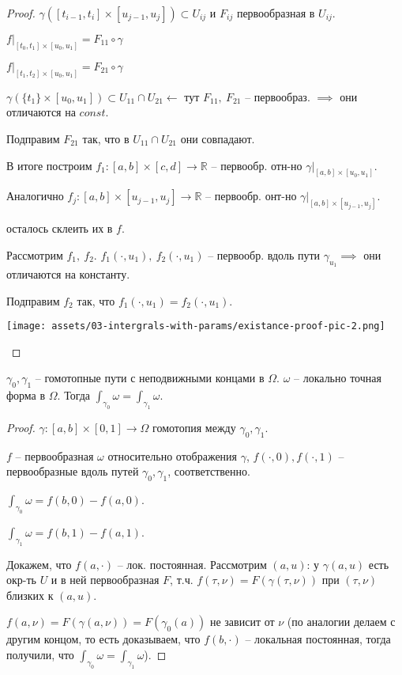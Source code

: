 \begin{proof}
    $\gamma([t_{i - 1}, t_i] \times [u_{j - 1}, u_j]) \subset U_{ij}$ и $F_{ij}$ первообразная в $U_{ij}$.

    $f|_{[t_0, t_1] \times [u_0, u_1]} = F_{11} \circ \gamma$
    
    $f|_{[t_1, t_2] \times [u_0, u_1]} = F_{21} \circ \gamma$

    $\gamma(\{ t_1 \} \times [u_0, u_1]) \subset U_{11} \cap U_{21} \leftarrow$ тут $F_{11}, \ F_{21}$ -- первообраз. $\implies$ они отличаются на $const$.

    Подправим $F_{21}$ так, что в $U_{11} \cap U_{21}$ они совпадают.

    В итоге построим $f_1: [a, b] \times [c, d] \rightarrow \mathbb{R}$ -- первообр. отн-но $\gamma|_{[a, b] \times [u_0, u_1]}$.

    Аналогично $f_j: [a, b] \times [u_{j - 1}, u_j] \rightarrow \mathbb{R}$ -- первообр. онт-но $\gamma|_{[a, b] \times [u_{j - 1}, u_j]}$.

    осталось склеить их в $f$.

    Рассмотрим $f_1, \ f_2$. $f_1(\cdot, u_1), \ f_2(\cdot, u_1)$ -- первообр. вдоль пути $\gamma_{u_1} \implies$ они отличаются на константу.

    Подправим $f_2$ так, что $f_1(\cdot, u_1) = f_2(\cdot, u_1)$.

    \begin{center}
        \texttt{[image: assets/03-intergrals-with-params/existance-proof-pic-2.png]}
    \end{center}
\end{proof}

\begin{theorem}
    $\gamma_0, \gamma_1$ -- гомотопные пути с неподвижными концами в $\Omega$. $\omega$ -- локально точная форма в $\Omega$. Тогда $\int_{\gamma_0} {\omega} = \int_{\gamma_1} {\omega}$.
\end{theorem}
\begin{proof}
    $\gamma: [a, b] \times [0, 1] \rightarrow \Omega$ гомотопия между $\gamma_0, \gamma_1$.
    
    $f$ -- первообразная $\omega$ относительно отображения $\gamma$, $f(\cdot, 0), f(\cdot, 1)$ -- первообразные вдоль путей $\gamma_0, \gamma_1$, соответственно.

    $\int_{\gamma_0} {\omega} = f(b, 0) - f(a, 0)$.

    $\int_{\gamma_1} {\omega} = f(b, 1) - f(a, 1)$.
    
    Докажем, что $f(a, \cdot)$ -- лок. постоянная. Рассмотрим $(a, u)$: у $\gamma(a, u)$ есть окр-ть $U$ и в ней первообразная $F$, т.ч. $f(\tau, \nu) = F(\gamma(\tau, \nu))$ при $(\tau, \nu)$ близких к $(a, u)$.

    $f(a, \nu) = F(\gamma(a, \nu)) = F(\gamma_0(a))$ не зависит от $\nu$ (по аналогии делаем с другим концом, то есть доказываем, что $f(b, \cdot)$ -- локальная постоянная, тогда получили, что $\int_{\gamma_0} {\omega} = \int_{\gamma_1} {\omega}$).
\end{proof}

